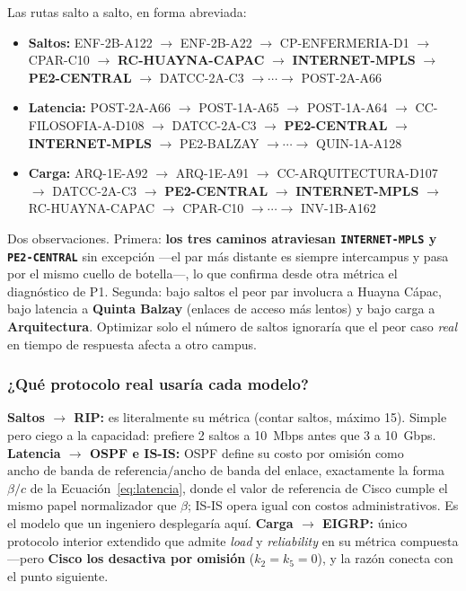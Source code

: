 \documentclass[11pt, a4paper]{article}
\begin{document}
Las rutas salto a salto, en forma abreviada:
{\scriptsize
\begin{itemize}\setlength{\itemsep}{1pt}
  \item \textbf{Saltos:} ENF-2B-A122 $\to$ ENF-2B-A22 $\to$
        CP-ENFERMERIA-D1 $\to$ CPAR-C10 $\to$ \textbf{RC-HUAYNA-CAPAC}
        $\to$ \textbf{INTERNET-MPLS} $\to$ \textbf{PE2-CENTRAL} $\to$
        DATCC-2A-C3 $\to\cdots\to$ POST-2A-A66
  \item \textbf{Latencia:} POST-2A-A66 $\to$ POST-1A-A65 $\to$ POST-1A-A64
        $\to$ CC-FILOSOFIA-A-D108 $\to$ DATCC-2A-C3 $\to$
        \textbf{PE2-CENTRAL} $\to$ \textbf{INTERNET-MPLS} $\to$ PE2-BALZAY
        $\to\cdots\to$ QUIN-1A-A128
  \item \textbf{Carga:} ARQ-1E-A92 $\to$ ARQ-1E-A91 $\to$
        CC-ARQUITECTURA-D107 $\to$ DATCC-2A-C3 $\to$ \textbf{PE2-CENTRAL}
        $\to$ \textbf{INTERNET-MPLS} $\to$ RC-HUAYNA-CAPAC $\to$ CPAR-C10
        $\to\cdots\to$ INV-1B-A162
\end{itemize}}

Dos observaciones. Primera: \textbf{los tres caminos atraviesan
\texttt{INTERNET-MPLS} y \texttt{PE2-CENTRAL}} sin excepción —el par más
distante es siempre intercampus y pasa por el mismo cuello de botella—, lo
que confirma desde otra métrica el diagnóstico de P1. Segunda: bajo saltos
el peor par involucra a Huayna Cápac, bajo latencia a \textbf{Quinta
Balzay} (enlaces de acceso más lentos) y bajo carga a
\textbf{Arquitectura}. Optimizar solo el número de saltos ignoraría que el
peor caso \textit{real} en tiempo de respuesta afecta a otro campus.

\subsubsection*{¿Qué protocolo real usaría cada modelo?}

\textbf{Saltos $\to$ RIP:} es literalmente su métrica (contar saltos, máximo
15). Simple pero ciego a la capacidad: prefiere 2 saltos a 10~Mbps antes que
3 a 10~Gbps. \textbf{Latencia $\to$ OSPF e IS-IS:} OSPF define su costo por
omisión como $\text{ancho de banda de referencia}/\text{ancho de banda del
enlace}$, exactamente la forma $\beta/c$ de la
Ecuación~\eqref{eq:latencia}, donde el valor de referencia de Cisco cumple
el mismo papel normalizador que $\beta$; IS-IS opera igual con costos
administrativos. Es el modelo que un ingeniero desplegaría aquí.
\textbf{Carga $\to$ EIGRP:} único protocolo interior extendido que admite
\textit{load} y \textit{reliability} en su métrica compuesta —pero
\textbf{Cisco los desactiva por omisión} ($k_2=k_5=0$), y la razón conecta
con el punto siguiente.
\end{document}
